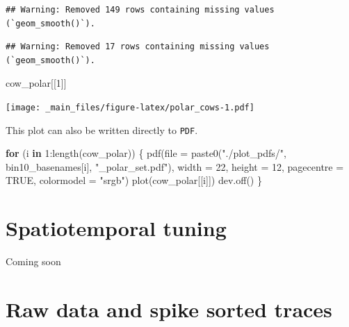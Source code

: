 \documentclass[
]{book}
\newenvironment{Shaded}{\begin{snugshade}}{\end{snugshade}}
\newcommand{\AttributeTok}[1]{\textcolor[rgb]{0.77,0.63,0.00}{#1}}
\newcommand{\ConstantTok}[1]{\textcolor[rgb]{0.00,0.00,0.00}{#1}}
\newcommand{\ControlFlowTok}[1]{\textcolor[rgb]{0.13,0.29,0.53}{\textbf{#1}}}
\newcommand{\DecValTok}[1]{\textcolor[rgb]{0.00,0.00,0.81}{#1}}
\newcommand{\FunctionTok}[1]{\textcolor[rgb]{0.00,0.00,0.00}{#1}}
\newcommand{\NormalTok}[1]{#1}
\newcommand{\SpecialCharTok}[1]{\textcolor[rgb]{0.00,0.00,0.00}{#1}}
\newcommand{\StringTok}[1]{\textcolor[rgb]{0.31,0.60,0.02}{#1}}
\begin{document}
\begin{verbatim}
## Warning: Removed 149 rows containing missing values (`geom_smooth()`).
\end{verbatim}

\begin{verbatim}
## Warning: Removed 17 rows containing missing values (`geom_smooth()`).
\end{verbatim}

\begin{Shaded}
\begin{Highlighting}[]
\NormalTok{cow\_polar[[}\DecValTok{1}\NormalTok{]]}
\end{Highlighting}
\end{Shaded}

\texttt{[image: \_main\_files/figure-latex/polar\_cows-1.pdf]}

This plot can also be written directly to \texttt{PDF}.

\begin{Shaded}
\begin{Highlighting}[]
\ControlFlowTok{for}\NormalTok{ (i }\ControlFlowTok{in} \DecValTok{1}\SpecialCharTok{:}\FunctionTok{length}\NormalTok{(cow\_polar)) \{}
  \FunctionTok{pdf}\NormalTok{(}\AttributeTok{file =}
        \FunctionTok{paste0}\NormalTok{(}\StringTok{"./plot\_pdfs/"}\NormalTok{,}
\NormalTok{               bin10\_basenames[i],}
               \StringTok{"\_polar\_set.pdf"}\NormalTok{),}
      \AttributeTok{width =} \DecValTok{22}\NormalTok{, }\AttributeTok{height =} \DecValTok{12}\NormalTok{,}
      \AttributeTok{pagecentre =} \ConstantTok{TRUE}\NormalTok{, }\AttributeTok{colormodel =} \StringTok{"srgb"}\NormalTok{)}
  \FunctionTok{plot}\NormalTok{(cow\_polar[[i]])}
  \FunctionTok{dev.off}\NormalTok{()}
\NormalTok{\}}
\end{Highlighting}
\end{Shaded}

\hypertarget{spatiotemporal-tuning}{%
\chapter{Spatiotemporal tuning}\label{spatiotemporal-tuning}}

Coming soon

\hypertarget{raw-data-and-spike-sorted-traces}{%
\chapter{Raw data and spike sorted traces}\label{raw-data-and-spike-sorted-traces}}
\end{document}
